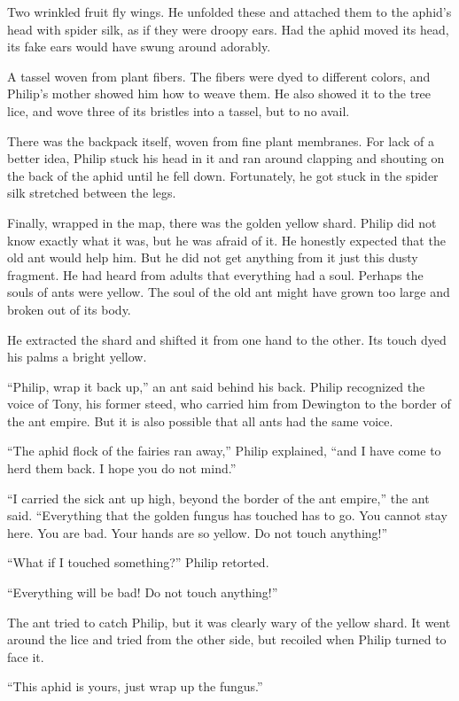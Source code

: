 \documentclass[10pt, draft]{memoir}
\begin{document}
Two wrinkled fruit fly wings. He unfolded these and attached them to the
aphid's head with spider silk, as if they were droopy ears. Had the aphid moved
its head, its fake ears would have swung around adorably.

A tassel woven from plant fibers. The fibers were dyed to different colors, and
Philip's mother showed him how to weave them. He also showed it to the tree
lice, and wove three of its bristles into a tassel, but to no avail.

There was the backpack itself, woven from fine plant membranes. For lack of a
better idea, Philip stuck his head in it and ran around clapping and shouting
on the back of the aphid until he fell down. Fortunately, he got stuck in the
spider silk stretched between the legs.

Finally, wrapped in the map, there was the golden yellow shard. Philip did not
know exactly what it was, but he was afraid of it. He honestly expected that
the old ant would help him. But he did not get anything from it just this dusty
fragment. He had heard from adults that everything had a soul. Perhaps the
souls of ants were yellow. The soul of the old ant might have grown too large
and broken out of its body.

He extracted the shard and shifted it from one hand to the other. Its touch
dyed his palms a bright yellow.

``Philip, wrap it back up,'' an ant said behind his back. Philip recognized the
voice of Tony, his former steed, who carried him from Dewington to the border
of the ant empire. But it is also possible that all ants had the same voice.

``The aphid flock of the fairies ran away,'' Philip explained, ``and I have
come to herd them back. I hope you do not mind.''

``I carried the sick ant up high, beyond the border of the ant empire,'' the
ant said. ``Everything that the golden fungus has touched has to go. You cannot
stay here. You are bad. Your hands are so yellow. Do not touch anything!''

``What if I touched something?'' Philip retorted.

``Everything will be bad! Do not touch anything!''

The ant tried to catch Philip, but it was clearly wary of the yellow shard. It
went around the lice and tried from the other side, but recoiled when Philip
turned to face it.

``This aphid is yours, just wrap up the fungus.''
\end{document}
